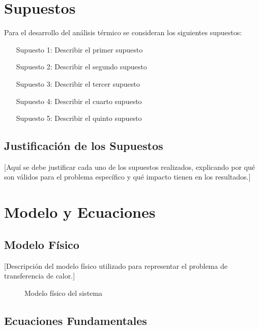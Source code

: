 \documentclass[12pt,letterpaper]{article}
\begin{document}
\section{Supuestos}

Para el desarrollo del análisis térmico se consideran los siguientes supuestos:

\begin{enumerate}
    \item [Supuesto 1: Describir el primer supuesto]
    \item [Supuesto 2: Describir el segundo supuesto]
    \item [Supuesto 3: Describir el tercer supuesto]
    \item [Supuesto 4: Describir el cuarto supuesto]
    \item [Supuesto 5: Describir el quinto supuesto]
\end{enumerate}

\subsection{Justificación de los Supuestos}
[Aquí se debe justificar cada uno de los supuestos realizados, explicando por qué son válidos para el problema específico y qué impacto tienen en los resultados.]

\newpage
\section{Modelo y Ecuaciones}

\subsection{Modelo Físico}
[Descripción del modelo físico utilizado para representar el problema de transferencia de calor.]

\begin{figure}[H]
    \centering
    \caption{Modelo físico del sistema}
    \label{fig:modelo_fisico}
\end{figure}

\subsection{Ecuaciones Fundamentales}
\end{document}
